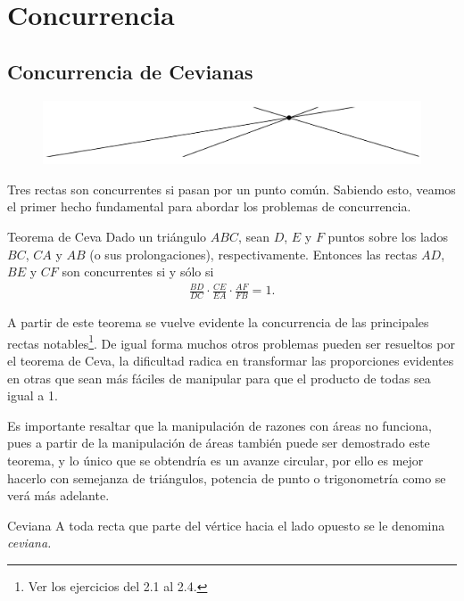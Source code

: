 \newpage
\section{Concurrencia}


\subsection{Concurrencia de Cevianas}


\begin{figure}[htb]
    \centering
    \includegraphics[width=14cm]{images/concurrence-1}
\end{figure}

Tres rectas son concurrentes si pasan por un punto común.
Sabiendo esto, veamos el primer hecho fundamental para abordar los problemas de concurrencia.

\begin{section-theorem.tcb}{Teorema de Ceva}{}
    Dado un triángulo $ABC$, sean $D$, $E$ y $F$ puntos sobre los lados $BC$, $CA$ y $AB$ (o sus prolongaciones), respectivamente.
    Entonces las rectas $AD$, $BE$ y $CF$ son concurrentes si y sólo si
    \begin{gather*}
        \frac{BD}{DC} \cdot \frac{CE}{EA} \cdot \frac{AF}{FB} = 1.
    \end{gather*}
\end{section-theorem.tcb}

A partir de este teorema se vuelve evidente la concurrencia de las principales rectas notables\footnote{Ver los ejercicios del 2.1 al 2.4.}.
De igual forma muchos otros problemas pueden ser resueltos por el teorema de Ceva, la dificultad radica en transformar las proporciones evidentes en otras que sean más fáciles de manipular para que el producto de todas sea igual a 1.

Es importante resaltar que la manipulación de razones con áreas no funciona, pues a partir de la manipulación de áreas también puede ser demostrado este teorema, y lo único que se obtendría es un avanze circular, por ello es mejor hacerlo con semejanza de triángulos, potencia de punto o trigonometría como se verá más adelante.

\begin{section-definition.tcb}{Ceviana}{}
    A toda recta que parte del vértice hacia el lado opuesto se le denomina \textit{ceviana.}
\end{section-definition.tcb}

